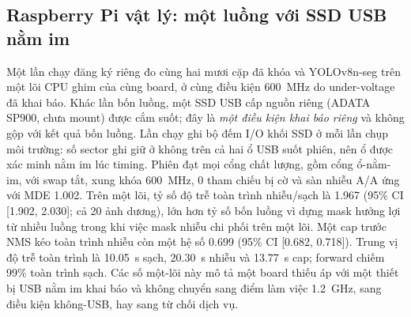 \subsection{Raspberry Pi vật lý: một luồng với SSD USB nằm im}
\label{app:pi3b-pi1}
Một lần chạy đăng ký riêng đo cùng hai mươi cặp đã khóa và YOLOv8n-seg trên một lõi CPU ghim của cùng board, ở cùng điều kiện 600~MHz do under-voltage đã khai báo. Khác lần bốn luồng, một SSD USB cấp nguồn riêng (ADATA SP900, chưa mount) được cắm suốt; đây là \emph{một điều kiện khai báo riêng} và không gộp với kết quả bốn luồng. Lần chạy ghi bộ đếm I/O khối SSD ở mỗi lần chụp môi trường: số sector ghi giữ ở không trên cả hai ổ USB suốt phiên, nên ổ được xác minh nằm im lúc timing. Phiên đạt mọi cổng chất lượng, gồm cổng ổ-nằm-im, với swap tắt, xung khóa 600~MHz, 0 tham chiếu bị cờ và sàn nhiễu A/A ứng với MDE 1.002. Trên một lõi, tỷ số độ trễ toàn trình nhiễu/sạch là 1.967 (95\% CI [1.902, 2.030]; cả 20 ảnh dương), lớn hơn tỷ số bốn luồng vì dựng mask hưởng lợi từ nhiều luồng trong khi việc mask nhiễu chi phối trên một lõi. Một cap trước NMS kéo toàn trình nhiễu còn một hệ số 0.699 (95\% CI [0.682, 0.718]). Trung vị độ trễ toàn trình là 10.05~s sạch, 20.30~s nhiễu và 13.77~s cap; forward chiếm 99\% toàn trình sạch. Các số một-lõi này mô tả một board thiếu áp với một thiết bị USB nằm im khai báo và không chuyển sang điểm làm việc 1.2~GHz, sang điều kiện không-USB, hay sang từ chối dịch vụ.

